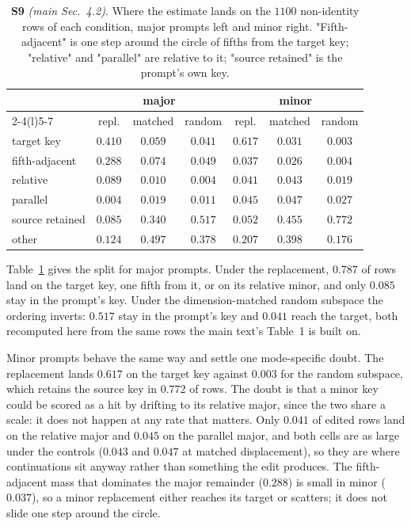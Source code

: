\documentclass{article}
\begin{document}
\begin{table}[!t]
\centering
\caption{\textbf{S9} \textit{(main Sec.~4.2)}. Where the estimate lands on the $1100$
non-identity rows of each condition, major prompts left and minor right.
"Fifth-adjacent" is one step around the circle of fifths from the target key;
"relative" and "parallel" are relative to it; "source retained" is the prompt's own key.}
\label{tab:supp-landing}
\small
\setlength{\tabcolsep}{4pt}
\begin{tabular}{@{}lccc@{\hskip 6pt}ccc@{}}
\toprule
& \multicolumn{3}{c}{major} & \multicolumn{3}{c}{minor}\\
\cmidrule(r){2-4}\cmidrule(l){5-7}
 & repl. & matched & random & repl. & matched & random \\
\midrule
target key      & $0.410$ & $0.059$ & $0.041$ & $0.617$ & $0.031$ & $0.003$ \\
fifth-adjacent     & $0.288$ & $0.074$ & $0.049$ & $0.037$ & $0.026$ & $0.004$ \\
relative           & $0.089$ & $0.010$ & $0.004$ & $0.041$ & $0.043$ & $0.019$ \\
parallel           & $0.004$ & $0.019$ & $0.011$ & $0.045$ & $0.047$ & $0.027$ \\
source retained    & $0.085$ & $0.340$ & $0.517$ & $0.052$ & $0.455$ & $0.772$ \\
other              & $0.124$ & $0.497$ & $0.378$ & $0.207$ & $0.398$ & $0.176$ \\
\bottomrule
\end{tabular}
\end{table}

Table~\ref{tab:supp-landing} gives the split for major prompts. Under the replacement,
$0.787$ of rows land on the target key, one fifth from it, or on its relative minor,
and only $0.085$ stay in the prompt's key. Under the dimension-matched random subspace the
ordering inverts: $0.517$ stay in the prompt's key and $0.041$ reach the target, both
recomputed here from the same rows the main text's Table~1 is built on.

Minor prompts behave the same way and settle one mode-specific doubt. The replacement
lands $0.617$ on the target key against $0.003$ for the random subspace, which
retains the source key in $0.772$ of rows. The doubt is that a minor key could be scored
as a hit by drifting to its relative major, since the two share a scale: it does not
happen at any rate that matters. Only $0.041$ of edited rows land on the relative major
and $0.045$ on the parallel major, and both cells are as large under the controls
($0.043$ and $0.047$ at matched displacement), so they are where continuations sit
anyway rather than something the edit produces. The fifth-adjacent mass that dominates
the major remainder ($0.288$) is small in minor ($0.037$), so a minor replacement either
reaches its target or scatters; it does not slide one step around the circle.
\end{document}

